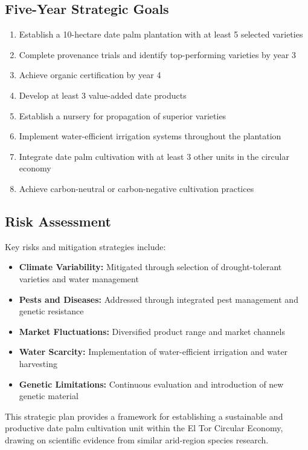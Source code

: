 \subsection{Five-Year Strategic Goals}
\begin{enumerate}
    \item Establish a 10-hectare date palm plantation with at least 5 selected varieties
    \item Complete provenance trials and identify top-performing varieties by year 3
    \item Achieve organic certification by year 4
    \item Develop at least 3 value-added date products
    \item Establish a nursery for propagation of superior varieties
    \item Implement water-efficient irrigation systems throughout the plantation
    \item Integrate date palm cultivation with at least 3 other units in the circular economy
    \item Achieve carbon-neutral or carbon-negative cultivation practices
\end{enumerate}

\subsection{Risk Assessment}
Key risks and mitigation strategies include:

\begin{itemize}
    \item \textbf{Climate Variability:} Mitigated through selection of drought-tolerant varieties and water management
    \item \textbf{Pests and Diseases:} Addressed through integrated pest management and genetic resistance
    \item \textbf{Market Fluctuations:} Diversified product range and market channels
    \item \textbf{Water Scarcity:} Implementation of water-efficient irrigation and water harvesting
    \item \textbf{Genetic Limitations:} Continuous evaluation and introduction of new genetic material
\end{itemize}

This strategic plan provides a framework for establishing a sustainable and productive date palm cultivation unit within the El Tor Circular Economy, drawing on scientific evidence from similar arid-region species research.
